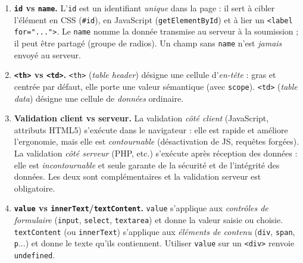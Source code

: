 \documentclass[11pt]{article}
\begin{document}
\begin{corrige}
\begin{enumerate}
    \item \textbf{\texttt{id} vs \texttt{name}.} L'\texttt{id} est un identifiant \emph{unique} dans la page : il sert à cibler l'élément en CSS (\texttt{\#id}), en JavaScript (\texttt{getElementById}) et à lier un \texttt{<label for="...">}. Le \texttt{name} nomme la donnée transmise au serveur à la soumission ; il peut être partagé (groupe de radios). Un champ sans \texttt{name} n'est \emph{jamais} envoyé au serveur.
    \item \textbf{\texttt{<th>} vs \texttt{<td>}.} \texttt{<th>} (\emph{table header}) désigne une cellule d'\emph{en-tête} : gras et centrée par défaut, elle porte une valeur sémantique (avec \texttt{scope}). \texttt{<td>} (\emph{table data}) désigne une cellule de \emph{données} ordinaire.
    \item \textbf{Validation client vs serveur.} La validation \emph{côté client} (JavaScript, attributs HTML5) s'exécute dans le navigateur : elle est rapide et améliore l'ergonomie, mais elle est \emph{contournable} (désactivation de JS, requêtes forgées). La validation \emph{côté serveur} (PHP, etc.) s'exécute après réception des données : elle est \emph{incontournable} et seule garante de la sécurité et de l'intégrité des données. Les deux sont complémentaires et la validation serveur est obligatoire.
    \item \textbf{\texttt{value} vs \texttt{innerText}/\texttt{textContent}.} \texttt{value} s'applique aux \emph{contrôles de formulaire} (\texttt{input}, \texttt{select}, \texttt{textarea}) et donne la valeur saisie ou choisie. \texttt{textContent} (ou \texttt{innerText}) s'applique aux \emph{éléments de contenu} (\texttt{div}, \texttt{span}, \texttt{p}...) et donne le texte qu'ils contiennent. Utiliser \texttt{value} sur un \texttt{<div>} renvoie \texttt{undefined}.
\end{enumerate}
\end{corrige}
\end{document}

